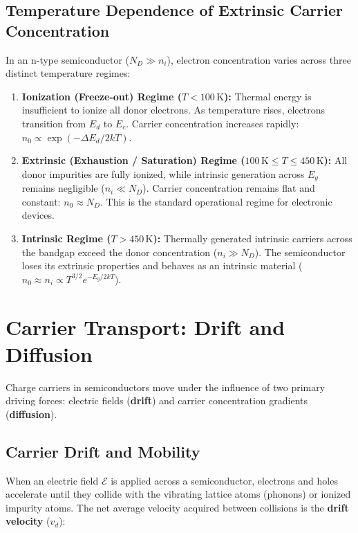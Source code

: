 \documentclass[12pt,a4paper]{article}
\begin{document}
\subsection{Temperature Dependence of Extrinsic Carrier Concentration}
In an n-type semiconductor ($N_D \gg n_i$), electron concentration varies across three distinct temperature regimes:

\begin{enumerate}[label=\arabic*., leftmargin=*]
  \item \textbf{Ionization (Freeze-out) Regime ($T < 100\,\text{K}$):} Thermal energy is insufficient to ionize all donor electrons. As temperature rises, electrons transition from $E_d$ to $E_c$. Carrier concentration increases rapidly: $n_0 \propto \exp(-\Delta E_d / 2kT)$.
  \item \textbf{Extrinsic (Exhaustion / Saturation) Regime ($100\,\text{K} \le T \le 450\,\text{K}$):} All donor impurities are fully ionized, while intrinsic generation across $E_g$ remains negligible ($n_i \ll N_D$). Carrier concentration remains flat and constant: $n_0 \approx N_D$. This is the standard operational regime for electronic devices.
  \item \textbf{Intrinsic Regime ($T > 450\,\text{K}$):} Thermally generated intrinsic carriers across the bandgap exceed the donor concentration ($n_i \gg N_D$). The semiconductor loses its extrinsic properties and behaves as an intrinsic material ($n_0 \approx n_i \propto T^{3/2} e^{-E_g/2kT}$).
\end{enumerate}

\section{Carrier Transport: Drift and Diffusion}

Charge carriers in semiconductors move under the influence of two primary driving forces: electric fields (\textbf{drift}) and carrier concentration gradients (\textbf{diffusion}).

\subsection{Carrier Drift and Mobility}
When an electric field $\mathcal{E}$ is applied across a semiconductor, electrons and holes accelerate until they collide with the vibrating lattice atoms (phonons) or ionized impurity atoms. The net average velocity acquired between collisions is the \textbf{drift velocity} ($v_d$):
\end{document}
